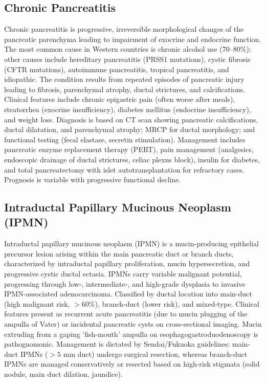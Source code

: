 \subsection{Chronic Pancreatitis}
\label{sec:Chronic Pancreatitis}
Chronic pancreatitis is progressive, irreversible morphological changes of the pancreatic parenchyma leading to impairment of exocrine and endocrine function. The most common cause in Western countries is chronic alcohol use (70--80\%); other causes include hereditary pancreatitis (PRSS1 mutations), cystic fibrosis (CFTR mutations), autoimmune pancreatitis, tropical pancreatitis, and idiopathic. The condition results from repeated episodes of pancreatic injury leading to fibrosis, parenchymal atrophy, ductal strictures, and calcifications. Clinical features include chronic epigastric pain (often worse after meals), steatorrhea (exocrine insufficiency), diabetes mellitus (endocrine insufficiency), and weight loss. Diagnosis is based on CT scan showing pancreatic calcifications, ductal dilatation, and parenchymal atrophy; MRCP for ductal morphology; and functional testing (fecal elastase, secretin stimulation). Management includes pancreatic enzyme replacement therapy (PERT), pain management (analgesics, endoscopic drainage of ductal strictures, celiac plexus block), insulin for diabetes, and total pancreatectomy with islet autotransplantation for refractory cases. Prognosis is variable with progressive functional decline.

\subsection{Intraductal Papillary Mucinous Neoplasm (IPMN)}
\label{sec:Intraductal Papillary Mucinous Neoplasm (IPMN)}
Intraductal papillary mucinous neoplasm (IPMN) is a mucin-producing epithelial precursor lesion arising within the main pancreatic duct or branch ducts, characterized by intraductal papillary proliferation, mucin hypersecretion, and progressive cystic ductal ectasia. IPMNs carry variable malignant potential, progressing through low-, intermediate-, and high-grade dysplasia to invasive IPMN-associated adenocarcinoma. Classified by ductal location into main-duct (high malignant risk, $>60\%$), branch-duct (lower risk), and mixed-type. Clinical features present as recurrent acute pancreatitis (due to mucin plugging of the ampulla of Vater) or incidental pancreatic cysts on cross-sectional imaging. Mucin extruding from a gaping 'fish-mouth' ampulla on esophagogastroduodenoscopy is pathognomonic. Management is dictated by Sendai/Fukuoka guidelines: main-duct IPMNs ($>5$ mm duct) undergo surgical resection, whereas branch-duct IPMNs are managed conservatively or resected based on high-risk stigmata (solid nodule, main duct dilation, jaundice).

